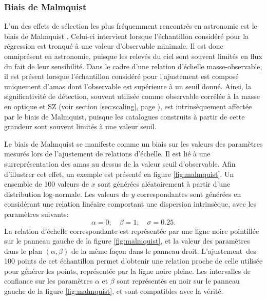 \subsubsection{Biais de Malmquist} %
\label{sec:scaling:malmquist}

L'un des effets de sélection les plus fréquemment rencontrés en astronomie est le biais de Malmquist \cite{malmquist_relations_1922}.
Celui-ci intervient lorsque l'échantillon considéré pour la régression est tronqué à une valeur d'observable minimale.
Il est donc omniprésent en astronomie, puisque les relevés du ciel sont souvent limités en flux du fait de leur sensibilité.
Dans le cadre d'une relation d'échelle masse-observable, il est présent lorsque l'échantillon considéré pour l'ajustement est composé uniquement d'amas dont l'observable est supérieure à un seuil donné.
Ainsi, la significativité de détection, souvent utilisée comme observable corrélée à la masse en optique et SZ (voir section \ref{sec:scaling}, page \pageref{sec:scaling}), est intrinsèquement affectée par le biais de Malmquist, puisque les catalogues construits à partir de cette grandeur sont souvent limités à une valeur seuil.

Le biais de Malmquist se manifeste comme un biais sur les valeurs des paramètres mesurés lors de l'ajustement de relations d'échelle.
Il est lié à une surreprésentation des amas au dessus de la valeur seuil d'observable.
Afin d'illustrer cet effet, un exemple est présenté en figure \ref{fig:malmquist}.
Un ensemble de 100 valeurs de $x$ sont générées aléatoirement à partir d'une distribution log-normale.
Les valeurs de $y$ correspondantes sont générées en considérant une relation linéaire comportant une dispersion intrinsèque, avec les paramètres suivants:
\begin{equation}
    \alpha = 0; \quad \beta = 1; \quad \sigma = 0.25.
\end{equation}
La relation d'échelle correspondante est représentée par une ligne noire pointillée sur le panneau gauche de la figure \ref{fig:malmquist}, et la valeur des paramètres dans le plan $(\alpha, \beta)$  de la même façon dans le panneau droit.
L'ajustement\footnotemark\ des 100 points de cet échantillon permet d'obtenir une relation proche de celle utilisée pour générer les points, représentée par la ligne noire pleine.
Les intervalles de confiance sur les paramètres $\alpha$ et $\beta$ sont représentés en noir sur le panneau gauche de la figure \ref{fig:malmquist}, et sont compatibles avec la vérité.

